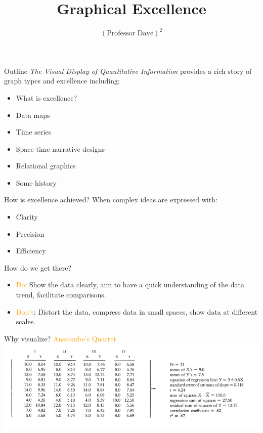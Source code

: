 \documentclass[
  ignorenonframetext,
]{beamer}
\title{Graphical Excellence}
\author{\((\text{Professor Dave})^2\)}
\date{}
\begin{document}
\frame{\titlepage}

\begin{frame}{Outline}
\protect\hypertarget{outline}{}
\emph{The Visual Display of Quantitative Information} provides a rich
story of graph types and excellence including:

\begin{itemize}
\item
  What is excellence?
\item
  Data maps
\item
  Time series
\item
  Space-time narrative designs
\item
  Relational graphics
\item
  Some history
\end{itemize}
\end{frame}

\begin{frame}{How is excellence achieved?}
\protect\hypertarget{how-is-excellence-achieved}{}
When complex ideas are expressed with:

\begin{itemize}
\item
  Clarity
\item
  Precision
\item
  Efficiency
\end{itemize}

\vspace{4mm}
\pause

How do we get there?

\begin{itemize}
\item
  \textcolor{orange}{Do}: Show the data clearly, aim to have a quick
  understanding of the data trend, facilitate comparisons.
\item
  \textcolor{orange}{Don't}: Distort the data, compress data in small
  spaces, show data at different scales.
\end{itemize}
\end{frame}

\begin{frame}{Why visualize? \textcolor{orange}{Anscombe's Quartet}}
\protect\hypertarget{why-visualize}{}
\includegraphics{excellence_figs/fig_1.png}
\end{frame}
\end{document}
